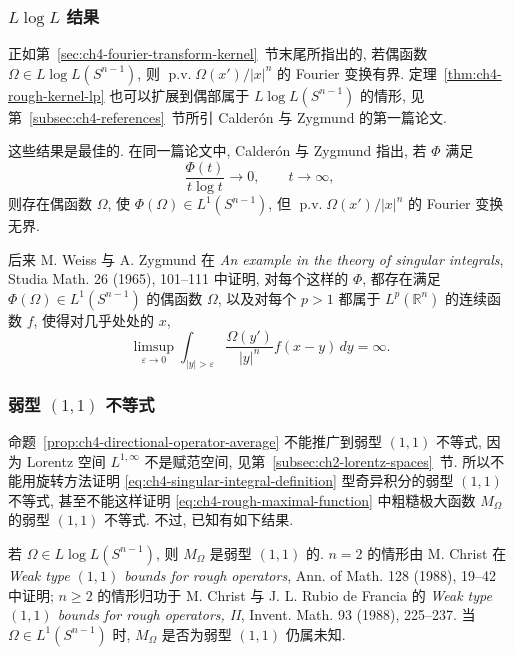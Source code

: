 \subsubsection{$L\log L$ 结果}
\label{subsec:ch4-l-log-l-results}

正如第~\ref{sec:ch4-fourier-transform-kernel}~节末尾所指出的, 若偶函数 $\Omega\in L\log L(S^{n-1})$, 则 $\operatorname{p.v.}\Omega(x')/|x|^n$ 的 Fourier 变换有界. 定理~\ref{thm:ch4-rough-kernel-lp} 也可以扩展到偶部属于 $L\log L(S^{n-1})$ 的情形, 见第~\ref{subsec:ch4-references}~节所引 Calderón 与 Zygmund 的第一篇论文.

这些结果是最佳的. 在同一篇论文中, Calderón 与 Zygmund 指出, 若 $\Phi$ 满足
\[
 \frac{\Phi(t)}{t\log t}\longrightarrow0,
 \qquad t\to\infty,
\]
则存在偶函数 $\Omega$, 使 $\Phi(\Omega)\in L^1(S^{n-1})$, 但 $\operatorname{p.v.}\Omega(x')/|x|^n$ 的 Fourier 变换无界.

后来 M. Weiss 与 A. Zygmund 在 \emph{An example in the theory of singular integrals}, Studia Math. 26 (1965), 101--111 中证明, 对每个这样的 $\Phi$, 都存在满足 $\Phi(\Omega)\in L^1(S^{n-1})$ 的偶函数 $\Omega$, 以及对每个 $p>1$ 都属于 $L^p(\mathbb R^n)$ 的连续函数 $f$, 使得对几乎处处的 $x$,
\[
 \limsup_{\varepsilon\to0}
 \int_{|y|>\varepsilon}\frac{\Omega(y')}{|y|^n}f(x-y)\,dy=\infty.
\]

\subsubsection{弱型 $(1,1)$ 不等式}
\label{subsec:ch4-weak-one-one}

命题~\ref{prop:ch4-directional-operator-average} 不能推广到弱型 $(1,1)$ 不等式, 因为 Lorentz 空间 $L^{1,\infty}$ 不是赋范空间, 见第~\ref{subsec:ch2-lorentz-spaces}~节. 所以不能用旋转方法证明 \eqref{eq:ch4-singular-integral-definition} 型奇异积分的弱型 $(1,1)$ 不等式, 甚至不能这样证明 \eqref{eq:ch4-rough-maximal-function} 中粗糙极大函数 $M_\Omega$ 的弱型 $(1,1)$ 不等式. 不过, 已知有如下结果.

\hypertarget{chapter-04-page-100}{}
若 $\Omega\in L\log L(S^{n-1})$, 则 $M_\Omega$ 是弱型 $(1,1)$ 的. $n=2$ 的情形由 M. Christ 在 \emph{Weak type $(1,1)$ bounds for rough operators}, Ann. of Math. 128 (1988), 19--42 中证明; $n\ge2$ 的情形归功于 M. Christ 与 J. L. Rubio de Francia 的 \emph{Weak type $(1,1)$ bounds for rough operators, II}, Invent. Math. 93 (1988), 225--237. 当 $\Omega\in L^1(S^{n-1})$ 时, $M_\Omega$ 是否为弱型 $(1,1)$ 仍属未知.

